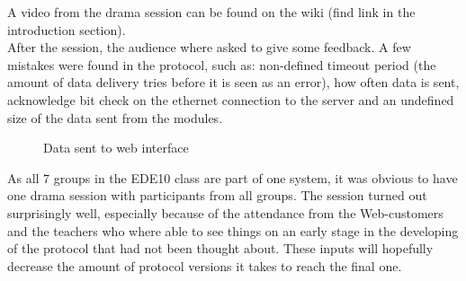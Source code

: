 A video from the drama session can be found on the wiki (find link in the introduction section).
\\[0.2cm]
After the session, the audience where asked to give some feedback. A few mistakes were found in the protocol, such as: non-defined timeout period (the amount of data delivery tries before it is seen as an error), how often data is sent, acknowledge bit check on the ethernet connection to the server and an undefined size of the data sent from the modules. 

\begin{figure}[H]
  \centering
  \hspace{0.2cm}                
  \caption{Data sent to web interface}
  \label{fig:drama_data_to_web}
\end{figure}

As all 7 groups in the EDE10 class are part of one system, it was obvious to have one drama session with participants from all groups. The session turned out surprisingly well, especially because of the attendance from the Web-customers and the teachers who where able to see things on an early stage in the developing of the protocol that had not been thought about. These inputs will hopefully decrease the amount of protocol versions it takes to reach the final one.

